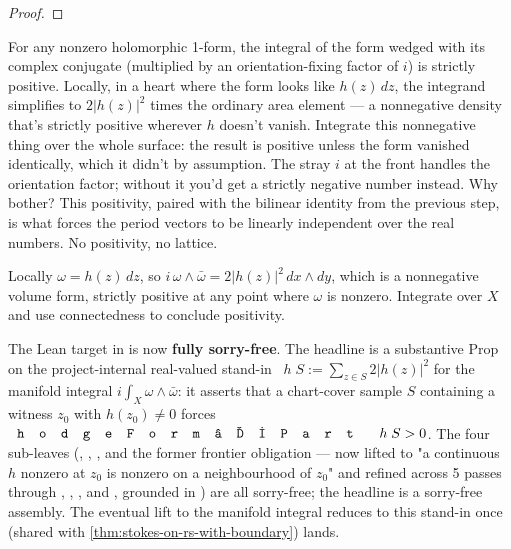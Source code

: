 \begin{proof}\leanok\end{proof}

\begin{layman}
For any nonzero holomorphic 1-form, the integral of the form wedged with
its complex conjugate (multiplied by an orientation-fixing factor of
\(i\)) is strictly positive. Locally, in a heart where the form looks
like \(h(z)\,dz\), the integrand simplifies to \(2|h(z)|^2\) times the
ordinary area element --- a nonnegative density that's strictly positive
wherever \(h\) doesn't vanish. Integrate this nonnegative thing over
the whole surface: the result is positive unless the form vanished
identically, which it didn't by assumption. The stray \(i\) at the
front handles the orientation factor; without it you'd get a strictly
negative number instead. Why bother? This positivity, paired with the
bilinear identity from the previous step, is what forces the period
vectors to be linearly independent over the real numbers. No
positivity, no lattice.
\end{layman}

\begin{proofsketch}
Locally \(\omega = h(z)\,dz\), so
\(i\,\omega\wedge\bar\omega = 2|h(z)|^{2}\,dx\wedge dy\),
which is a nonnegative volume form, strictly positive at any point
where \(\omega\) is nonzero. Integrate over \(X\) and use connectedness
to conclude positivity.

The Lean target in
 is now
\textbf{fully sorry-free}. The headline
 is a substantive Prop on the
project-internal real-valued stand-in
\, \(h\;S := \sum_{z\in S} 2|h(z)|^{2}\) for
the manifold integral \(i\int_X\omega\wedge\bar\omega\): it asserts
that a chart-cover sample \(S\) containing a witness \(z_0\) with
\(h(z_0)\neq 0\) forces \(\code{hodgeFormℝPart}\;h\;S > 0\). The four
sub-leaves (,
,
, and the former
frontier obligation
 --- now
lifted to "a continuous \(h\) nonzero at \(z_0\) is nonzero on a
neighbourhood of \(z_0\)" and refined across 5 passes through
,
,
, and
, grounded in
) are all sorry-free; the headline is
a sorry-free assembly. The eventual lift to the manifold integral
reduces to this stand-in once  (shared with
\ref{thm:stokes-on-rs-with-boundary}) lands.
\end{proofsketch}

